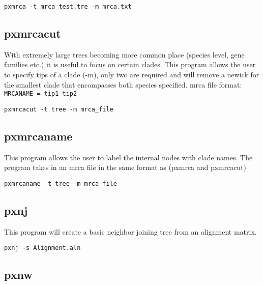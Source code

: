 \documentclass[12pt,letterpaper]{memoir}
\begin{document}
\begin{flushleft}
\begin{verbatim}
pxmrca -t mrca_test.tre -m mrca.txt
\end{verbatim}
\end{flushleft}


\subsection{pxmrcacut}

With extremely large trees becoming more common place (species level, gene families etc.) it is useful to focus on certain clades. This program allows the user to specify tips of a clade (-m), only two are required and will remove a newick for the smallest clade that encompasses both species specified. mrca file format:
\texttt{MRCANAME = tip1 tip2}

\begin{flushleft}
\begin{verbatim}
pxmrcacut -t tree -m mrca_file
\end{verbatim}
\end{flushleft}

\subsection{pxmrcaname}

This program allows the user to label the internal nodes with clade names. The program takes in an mrca file in the same format as (pxmrca and pxmrcacut)

\begin{flushleft}
\begin{verbatim}
pxmrcaname -t tree -m mrca_file
\end{verbatim}
\end{flushleft}

\subsection{pxnj}

This program will create a basic neighbor joining tree from an alignment matrix.

\begin{flushleft}
\begin{verbatim}
pxnj -s Alignment.aln
\end{verbatim}
\end{flushleft}

\subsection{pxnw}
\end{document}
